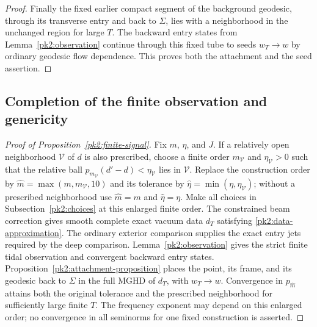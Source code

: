 \begin{proof}
Finally the fixed earlier compact segment of the background
geodesic, through its transverse entry and back to $\Sigma$,
lies with a neighborhood in the unchanged region for large $T$.
The backward entry states from Lemma~\ref{pk2:observation}
continue through this fixed tube to seeds $w_T\to w$ by
ordinary geodesic flow dependence. This proves both the
attachment and the seed assertion.
\end{proof}

\subsection{Completion of the finite observation and genericity}
\label{pk2:conclusion}

\begin{proof}[Proof of Proposition~\ref{pk2:finite-signal}]
Fix $m$, $\eta$, and $J$. If a relatively open neighborhood
$\mathcal V$ of $d$ is also prescribed, choose a finite order
$m_{\mathcal V}$ and $\eta_{\mathcal V}>0$ such that the relative
ball $p_{m_{\mathcal V}}(d'-d)<\eta_{\mathcal V}$ lies in
$\mathcal V$. Replace the construction order by
$\widehat m=\max(m,m_{\mathcal V},10)$ and its tolerance by
$\widehat\eta=\min(\eta,\eta_{\mathcal V})$; without a prescribed
neighborhood use $\widehat m=m$ and $\widehat\eta=\eta$.
Make all choices in Subsection~\ref{pk2:choices} at this enlarged
finite order. The constrained beam correction
gives smooth complete exact vacuum data $d_T$ satisfying
\eqref{pk2:data-approximation}. The ordinary exterior comparison
supplies the exact entry jets required by the deep comparison.
Lemma~\ref{pk2:observation} gives the strict finite tidal
observation and convergent backward entry states.
Proposition~\ref{pk2:attachment-proposition} places the point,
its frame, and its geodesic back to $\Sigma$ in the full MGHD
of $d_T$, with $w_T\to w$. Convergence in $p_{\widehat m}$
attains both the original tolerance and the prescribed
neighborhood for sufficiently large finite $T$. The frequency
exponent may depend on this enlarged order; no convergence in
all seminorms for one fixed construction is asserted.
\end{proof}

